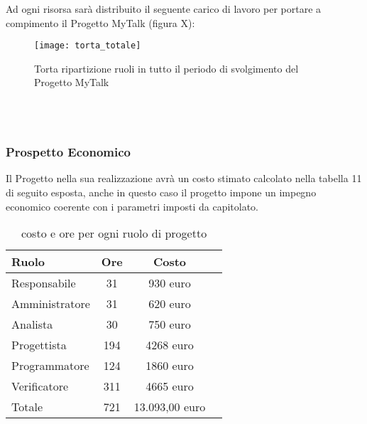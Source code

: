 Ad ogni risorsa sarà distribuito il seguente carico di lavoro per portare a compimento il Progetto MyTalk (figura X):\\
\begin{figure}[h]
  \texttt{[image: torta\_totale]}
\caption{Torta ripartizione ruoli in tutto il periodo di svolgimento del Progetto MyTalk}
\end{figure}
\\\\

\subsubsection{Prospetto Economico}
Il Progetto nella sua realizzazione avrà un costo stimato calcolato nella tabella 11 di seguito esposta, anche in questo caso il progetto impone un impegno economico coerente con i parametri imposti da capitolato.
\begin{table}[h]
\centering
\begin{tabular}{|l|c|cl|}
\hline
Ruolo& Ore& Costo& \\
\hline
Responsabile & 31 & 930 euro&\\
Amministratore  & 31& 620 euro&\\
Analista & 30& 750 euro&\\
Progettista  & 194& 4268 euro&\\
Programmatore & 124& 1860 euro&\\
Verificatore & 311 & 4665 euro&\\
\hline
Totale & 721 &13.093,00 euro&\\
\hline
\end{tabular}
\caption{costo e ore per ogni ruolo di progetto}
\end{table}

